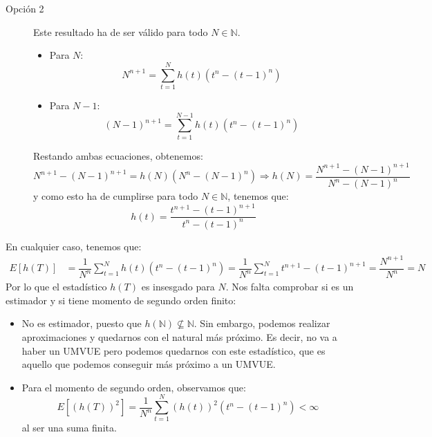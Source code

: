 \begin{ejercicio}
\begin{description}
        \item[Opción 2] Este resultado ha de ser válido para todo $N\in \mathbb{N}$.
        \begin{itemize}
            \item Para $N$:
            \begin{equation*}
                N^{n+1} = \sum_{t=1}^{N}h(t)(t^n-{(t-1)}^{n})
            \end{equation*}
            \item Para $N-1$:
            \begin{equation*}
                {(N-1)}^{n+1} = \sum_{t=1}^{N-1}h(t)(t^n-{(t-1)}^{n})
            \end{equation*}
        \end{itemize}
        Restando ambas ecuaciones, obtenemos:
        \begin{equation*}
            N^{n+1} - {(N-1)}^{n+1} = h(N)(N^n-{(N-1)}^{n}) \Longrightarrow h(N) = \dfrac{N^{n+1}-{(N-1)}^{n+1}}{N^n - {(N-1)}^{n}}
        \end{equation*}
        y como esto ha de cumplirse para todo $N\in \mathbb{N}$, tenemos que:
        \begin{equation*}
            h(t) = \dfrac{t^{n+1}-{(t-1)}^{n+1}}{t^n - {(t-1)}^{n}}
        \end{equation*}
    \end{description}


    En cualquier caso, tenemos que:
    \begin{align*}
        E[h(T)] &= \dfrac{1}{N^n}\sum_{t=1}^{N}h(t) (t^n-{(t-1)}^{n}) = \dfrac{1}{N^n}\sum_{t=1}^{N}t^{n+1}-{(t-1)}^{n+1} = \dfrac{N^{n+1}}{N^n} = N
    \end{align*}
    Por lo que el estadístico $h(T)$ es insesgado para $N$. Nos falta comprobar si es un estimador y si tiene momento de segundo orden finito:
    \begin{itemize}
        \item No es estimador, puesto que $h(\mathbb{N})\nsubseteq \mathbb{N}$. Sin embargo, podemos realizar aproximaciones y quedarnos con el natural más próximo. Es decir, no va a haber un UMVUE pero podemos quedarnos con este estadístico, que es aquello que podemos conseguir más próximo a un UMVUE. %
        \item Para el momento de segundo orden, observamos que:
            \begin{equation*}
                E[{(h(T))}^{2}] = \dfrac{1}{N^n}\sum_{t=1}^{N}{(h(t))}^{2}(t^n-{(t-1)}^{n}) < \infty
            \end{equation*}
            al ser una suma finita.
    \end{itemize}
\end{ejercicio}

